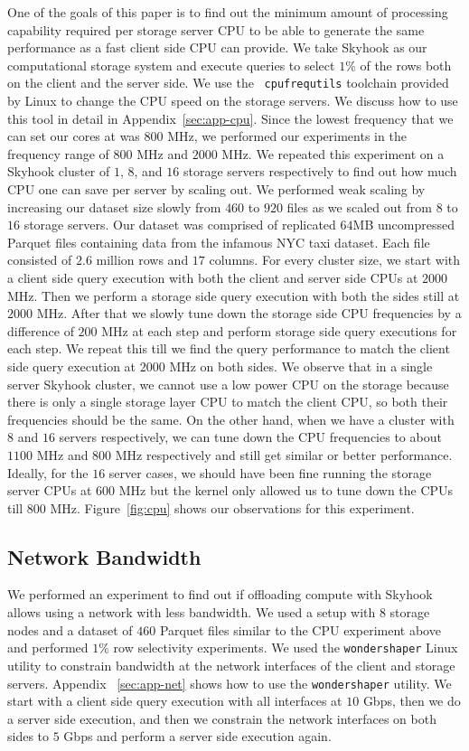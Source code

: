 \documentclass[11pt]{article}
\newcommand{\code}[1]{\colorbox{light-gray}{\texttt{#1}}}
\begin{document}
One of the goals of this paper is to find out the minimum amount of processing capability required per storage server CPU to be able to generate the same performance as a fast client side CPU can provide. We take Skyhook as our computational storage system and execute queries to select $1$\% of the rows both on the client and the server side. We use the ~\code{cpufrequtils} toolchain provided by Linux to change the CPU speed on the storage servers. We discuss how to use this tool in detail in Appendix~\ref{sec:app-cpu}. Since the lowest frequency that we can set our cores at was $800$ MHz, we performed our experiments in the frequency range of $800$ MHz and $2000$ MHz. We repeated this experiment on a Skyhook cluster of $1$, $8$, and $16$ storage servers respectively to find out how much CPU one can save per server by scaling out. We performed weak scaling by increasing our dataset size slowly from $460$ to $920$ files as we scaled out from $8$ to $16$ storage servers. Our dataset was comprised of replicated $64$MB uncompressed Parquet files containing data from the infamous NYC taxi dataset. Each file consisted of $2.6$ million rows and $17$ columns. For every cluster size, we start with a client side query execution with both the client and server side CPUs at $2000$ MHz. Then we perform a storage side query execution with both the sides still at $2000$ MHz. After that we slowly tune down the storage side CPU frequencies by a difference of $200$ MHz at each step and perform storage side query executions for each step. We repeat this till we find the query performance to match the client side query execution at $2000$ MHz on both sides. We observe that in a single server Skyhook cluster, we cannot use a low power CPU on the storage because there is only a single storage layer CPU to match the client CPU, so both their frequencies should be the same. On the other hand, when we have a cluster with $8$ and $16$ servers respectively, we can tune down the CPU frequencies to about $1100$ MHz and $800$ MHz respectively and still get similar or better performance. Ideally, for the $16$ server cases, we should have been fine running the storage server CPUs at $600$ MHz but the kernel only allowed us to tune down the CPUs till $800$ MHz. Figure~\ref{fig:cpu} shows our observations for this experiment.

\subsection{Network Bandwidth}
We performed an experiment to find out if offloading compute with Skyhook allows using a network with less bandwidth. We used a setup with $8$ storage nodes and a dataset of $460$ Parquet files similar to the CPU experiment above and performed $1$\% row selectivity experiments. We used the \code{wondershaper} Linux utility to constrain bandwidth at the network interfaces of the client and storage servers. Appendix ~\ref{sec:app-net} shows how to use the \code{wondershaper} utility. We start with a client side query execution with all interfaces at $10$ Gbps, then we do a server side execution, and then we constrain the network interfaces on both sides to $5$ Gbps and perform a server side execution again. 
\end{document}

